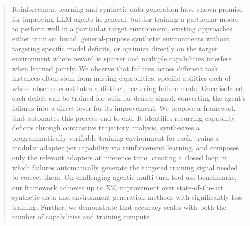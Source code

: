 \begin{abstract}
Reinforcement learning and synthetic data generation have shown promise for improving LLM agents in general, but for training a particular model to perform well in a particular target environment, existing approaches either train on broad, general-purpose synthetic environments without targeting specific model deficits, or optimize directly on the target environment where reward is sparser and multiple capabilities interfere when learned jointly. We observe that failures across different task instances often stem from missing capabilities, specific abilities each of whose absence constitutes a distinct, recurring failure mode. Once isolated, each deficit can be trained for with far denser signal, converting the agent's failures into a direct lever for its improvement. We propose a framework that automates this process end-to-end. It identifies recurring capability deficits through contrastive trajectory analysis, synthesizes a programmatically verifiable training environment for each, trains a modular adapter per capability via reinforcement learning, and composes only the relevant adapters at inference time, creating a closed loop in which failures automatically generate the targeted training signal needed to correct them. On challenging agentic multi-turn tool-use benchmarks, our framework achieves up to X\% improvement over state-of-the-art synthetic data and environment generation methods with significantly less training. Further, we demonstrate that accuracy scales with both the number of capabilities and training compute.
\end{abstract}
